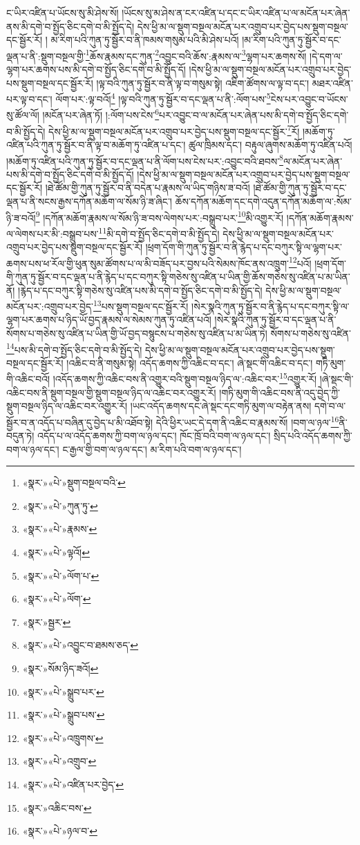 ང་ཡིར་འཛིན་པ་ཡོངས་སུ་མི་ཤེས་སོ། །ཡོངས་སུ་མ་ཤེས་ན་ངར་འཛིན་པ་དང་ང་ཡིར་འཛིན་པ་ལ་མངོན་པར་ཞེན་ནས་མི་དགེ་བ་སྤྱོད་ཅིང་དགེ་བ་མི་སྤྱོད་དེ། དེས་ཕྱི་མ་ལ་སྡུག་བསྔལ་མངོན་པར་འགྲུབ་པར་བྱེད་པས་སྡུག་བསྔལ་དང་སྦྱོར་རོ། །
མ་རིག་པའི་ཀུན་ཏུ་སྦྱོར་བ་ནི་ཁམས་གསུམ་པའི་མི་ཤེས་པའོ། །མ་རིག་པའི་ཀུན་ཏུ་སྦྱོར་བ་དང་ལྡན་པ་ནི་:སྡུག་བསྔལ་གྱི་\footnote{«སྣར་»«པེ་»སྡུག་བསྔལ་བའི་}ཆོས་རྣམས་དང་ཀུན་\footnote{«སྣར་»«པེ་»ཀུན་ཏུ་}འབྱུང་བའི་ཆོས་:རྣམས་ལ་\footnote{«སྣར་»«པེ་»རྣམས་}ལྷག་པར་ཆགས་སོ། །དེ་དག་ལ་ལྷག་པར་ཆགས་པས་མི་དགེ་བ་སྤྱོད་ཅིང་དགེ་བ་མི་སྤྱོད་དོ། །དེས་ཕྱི་མ་ལ་སྡུག་བསྔལ་མངོན་པར་འགྲུབ་པར་བྱེད་པས་སྡུག་བསྔལ་དང་སྦྱོར་རོ། །ལྟ་བའི་ཀུན་ཏུ་སྦྱོར་བ་ནི་ལྟ་བ་གསུམ་སྟེ། འཇིག་ཚོགས་ལ་ལྟ་བ་དང་། མཐར་འཛིན་པར་ལྟ་བ་དང་། ལོག་པར་:ལྟ་བའོ།\footnote{«སྣར་»«པེ་»ལྟའོ།} །ལྟ་བའི་ཀུན་ཏུ་སྦྱོར་བ་དང་ལྡན་པ་ནི་:ལོག་པས་\footnote{«སྣར་»«པེ་»ལོག་པ་}ངེས་པར་འབྱུང་བ་ཡོངས་སུ་ཚོལ་ལོ། །མངོན་པར་ཞེན་ཏོ། །:ལོག་པས་ངེས་\footnote{«སྣར་»«པེ་»ལོག་}པར་འབྱུང་བ་ལ་མངོན་པར་ཞེན་པས་མི་དགེ་བ་སྤྱོད་ཅིང་དགེ་བ་མི་སྤྱོད་དེ། དེས་ཕྱི་མ་ལ་སྡུག་བསྔལ་མངོན་པར་འགྲུབ་པར་བྱེད་པས་སྡུག་བསྔལ་དང་སྦྱོར་\footnote{«སྣར་»སྦྱར་}རོ། །མཆོག་ཏུ་འཛིན་པའི་ཀུན་ཏུ་སྦྱོར་བ་ནི་ལྟ་བ་མཆོག་ཏུ་འཛིན་པ་དང་། ཚུལ་ཁྲིམས་དང་། བརྟུལ་ཞུགས་མཆོག་ཏུ་འཛིན་པའོ། །མཆོག་ཏུ་འཛིན་པའི་ཀུན་ཏུ་སྦྱོར་བ་དང་ལྡན་པ་ནི་ལོག་པས་ངེས་པར་:འབྱུང་བའི་ཐབས་\footnote{«སྣར་»«པེ་»འབྱུང་བ་ཐམས་ཅད་}ལ་མངོན་པར་ཞེན་པས་མི་དགེ་བ་སྤྱོད་ཅིང་དགེ་བ་མི་སྤྱོད་དོ། །དེས་ཕྱི་མ་ལ་སྡུག་བསྔལ་མངོན་པར་འགྲུབ་པར་བྱེད་པས་སྡུག་བསྔལ་དང་སྦྱོར་རོ། །ཐེ་ཚོམ་གྱི་ཀུན་ཏུ་སྦྱོར་བ་ནི་བདེན་པ་རྣམས་ལ་ཡིད་གཉིས་ཟ་བའོ། །ཐེ་ཚོམ་གྱི་ཀུན་ཏུ་སྦྱོར་བ་དང་ལྡན་པ་ནི་སངས་རྒྱས་དཀོན་མཆོག་ལ་སོམ་ཉི་ཟ་ཞིང་། ཆོས་དཀོན་མཆོག་དང་དགེ་འདུན་དཀོན་མཆོག་ལ་:སོམ་ཉི་ཟ་བའོ།\footnote{«སྣར་»སོམ་ཉིད་ཟའོ།} །དཀོན་མཆོག་རྣམས་ལ་སོམ་ཉི་ཟ་བས་ལེགས་པར་:བསྒྲུབ་པར་\footnote{«སྣར་»«པེ་»སྒྲུབ་པར་}མི་འགྱུར་རོ། །དཀོན་མཆོག་རྣམས་ལ་ལེགས་པར་མི་:བསྒྲུབ་པས་\footnote{«སྣར་»«པེ་»སྒྲུབ་པས་}མི་དགེ་བ་སྤྱོད་ཅིང་དགེ་བ་མི་སྤྱོད་དེ། དེས་ཕྱི་མ་ལ་སྡུག་བསྔལ་མངོན་པར་འགྲུབ་པར་བྱེད་པས་སྡུག་བསྔལ་དང་སྦྱོར་རོ། །ཕྲག་དོག་གི་ཀུན་ཏུ་སྦྱོར་བ་ནི་རྙེད་པ་དང་བཀུར་སྟི་ལ་ལྷག་པར་ཆགས་པས་ཕ་རོལ་གྱི་ཕུན་སུམ་ཚོགས་པ་ལ་མི་བཟོད་པར་བྱས་པའི་སེམས་ཁོང་ནས་འཁྲུག་\footnote{«སྣར་»«པེ་»འཁྲུགས་}པའོ། །ཕྲག་དོག་གི་ཀུན་ཏུ་སྦྱོར་བ་དང་ལྡན་པ་ནི་རྙེད་པ་དང་བཀུར་སྟི་གཅེས་སུ་འཛིན་པ་ཡིན་གྱི་ཆོས་གཅེས་སུ་འཛིན་པ་མ་ཡིན་ནོ། །རྙེད་པ་དང་བཀུར་སྟི་གཅེས་སུ་འཛིན་པས་མི་དགེ་བ་སྤྱོད་ཅིང་དགེ་བ་མི་སྤྱོད་དེ། དེས་ཕྱི་མ་ལ་སྡུག་བསྔལ་མངོན་པར་:འགྲུབ་པར་བྱེད་\footnote{«སྣར་»«པེ་»འགྲུབ་}པས་སྡུག་བསྔལ་དང་སྦྱོར་རོ། །སེར་སྣའི་ཀུན་ཏུ་སྦྱོར་བ་ནི་རྙེད་པ་དང་བཀུར་སྟི་ལ་ལྷག་པར་ཆགས་པ་ཉིད་ཡོ་བྱད་རྣམས་ལ་སེམས་ཀུན་ཏུ་འཛིན་པའོ། །སེར་སྣའི་ཀུན་ཏུ་སྦྱོར་བ་དང་ལྡན་པ་ནི་སོགས་པ་གཅེས་སུ་འཛིན་པ་ཡིན་གྱི་ཡོ་བྱད་བསྙུངས་པ་གཅེས་སུ་འཛིན་པ་མ་ཡིན་ཏེ། སོགས་པ་གཅེས་སུ་འཛིན་\footnote{«སྣར་»«པེ་»འཛིན་པར་བྱེད་}པས་མི་དགེ་བ་སྤྱོད་ཅིང་དགེ་བ་མི་སྤྱོད་དེ། དེས་ཕྱི་མ་ལ་སྡུག་བསྔལ་མངོན་པར་འགྲུབ་པར་བྱེད་པས་སྡུག་བསྔལ་དང་སྦྱོར་རོ། །འཆིང་བ་ནི་གསུམ་སྟེ། འདོད་ཆགས་ཀྱི་འཆིང་བ་དང་། ཞེ་སྡང་གི་འཆིང་བ་དང་། གཏི་མུག་གི་འཆིང་བའོ། །འདོད་ཆགས་ཀྱི་འཆིང་བས་ནི་འགྱུར་བའི་སྡུག་བསྔལ་ཉིད་ལ་:འཆིང་བར་\footnote{«སྣར་»འཆིང་བས་}འགྱུར་རོ། །ཞེ་སྡང་གི་འཆིང་བས་ནི་སྡུག་བསྔལ་གྱི་སྡུག་བསྔལ་ཉིད་ལ་འཆིང་བར་འགྱུར་རོ། །གཏི་མུག་གི་འཆིང་བས་ནི་འདུ་བྱེད་ཀྱི་སྡུག་བསྔལ་ཉིད་ལ་འཆིང་བར་འགྱུར་རོ། །ཡང་འདོད་ཆགས་དང་ཞེ་སྡང་དང་གཏི་མུག་ལ་བརྟེན་ནས། དགེ་བ་ལ་སྦྱོར་བ་ན་འདོད་པ་བཞིན་དུ་བྱེད་པ་མི་འཐོབ་སྟེ། དེའི་ཕྱིར་ཡང་དེ་དག་ནི་འཆིང་བ་རྣམས་སོ། །བག་ལ་ཉལ་\footnote{«སྣར་»«པེ་»ཉལ་བ་}ནི་བདུན་ཏེ། འདོད་པ་ལ་འདོད་ཆགས་ཀྱི་བག་ལ་ཉལ་དང་། ཁོང་ཁྲོ་བའི་བག་ལ་ཉལ་དང་། སྲིད་པའི་འདོད་ཆགས་ཀྱི་བག་ལ་ཉལ་དང་། ང་རྒྱལ་གྱི་བག་ལ་ཉལ་དང་། མ་རིག་པའི་བག་ལ་ཉལ་དང་། 
